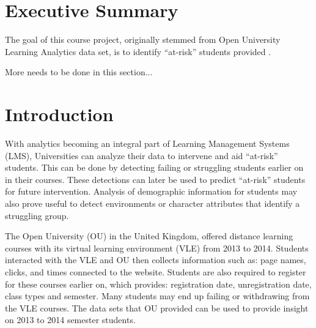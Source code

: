 \documentclass[12pt]{article}
\begin{document}

\tableofcontents
\pagebreak


\section{Executive Summary}

The goal of this course project, originally stemmed from Open University Learning Analytics data set, is to identify ``at-risk'' students 
provided \cite{oulad}.

More needs to be done in this section...

%
%

\section{Introduction}

With analytics becoming an integral part of Learning Management Systems (LMS), Universities can analyze their data to intervene and aid ``at-risk'' 
students. This can be done by detecting failing or struggling students earlier on in their courses. These detections can later be used to predict ``at-risk''
students for future intervention. Analysis of demographic information for students may also prove useful to detect environments or character
attributes that identify a struggling group.

The Open University (OU) in the United Kingdom, offered distance learning courses with its virtual learning environment (VLE) from 2013 to 2014. Students interacted with 
the VLE and OU then collects information such as: page names, clicks, and times connected to the website. Students are also required to register for these 
courses earlier on, which provides: registration date, unregistration date, class types and semester. Many students may end up failing or withdrawing from the VLE 
courses. The data sets that OU provided can be used to provide insight on 2013 to 2014 semester students. 
\end{document}

